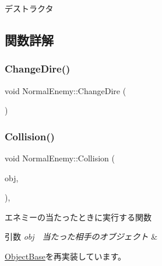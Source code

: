 デストラクタ 



\subsection{関数詳解}
\mbox{\label{class_normal_enemy_a9fe91caeeb6d9882e108c8c0d9d404c1}} 
\subsubsection{\texorpdfstring{Change\+Dire()}{ChangeDire()}}
{\footnotesize\ttfamily void Normal\+Enemy\+::\+Change\+Dire (\begin{DoxyParamCaption}{ }\end{DoxyParamCaption})\hspace{0.3cm}{\ttfamily [inline]}}

\mbox{\label{class_normal_enemy_a71cb11fe60d713ce638dcec5d66912e6}} 
\subsubsection{\texorpdfstring{Collision()}{Collision()}}
{\footnotesize\ttfamily void Normal\+Enemy\+::\+Collision (\begin{DoxyParamCaption}\item[{\mbox{\hyperlink{class_object_base}{Object\+Base}} $\ast$}]{obj,  }\item[{\mbox{\hyperlink{common_8h_ae148fff5818e9444b4ab2288829559bf}{Vec2}}}]{ }\end{DoxyParamCaption})\hspace{0.3cm}{\ttfamily [final]}, {\ttfamily [virtual]}}



エネミーの当たったときに実行する関数 


\begin{DoxyParams}{引数}
{\em obj　当たった相手のオブジェクト} & \\
\hline
\end{DoxyParams}


\mbox{\hyperlink{class_object_base_a3e1db79dfa119be067d816c22d09839d}{Object\+Base}}を再実装しています。

